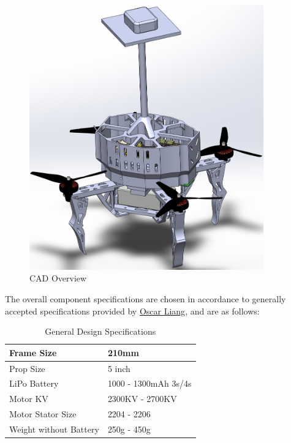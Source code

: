 \documentclass[12pt, titlepage]{article}
\begin{document}
\begin{figure}[h!]
  \begin{center} 
  \caption{CAD Overview}
  \label{OverallCAD}
        \includegraphics[width=0.9\textwidth]{CAD_Overview.png}
  \end{center}
\end{figure}

\clearpage

The overall component specifications are chosen in accordance to generally accepted specifications provided by \href{https://oscarliang.com/table-prop-motor-lipo-weight/}{Oscar Liang}, and are as follows:

\begin{table}[!h]
\begin{center}
\caption {General Design Specifications}
\label{tab:genDesignSpecs}
\begin{tabular}{ | m{7cm} | m{8cm} | } 
\hline
Frame Size & 210mm \\
\hline
Prop Size & 5 inch \\
\hline
LiPo Battery & 1000 - 1300mAh 3s/4s \\
\hline
Motor KV & 2300KV - 2700KV \\
\hline
Motor Stator Size & 2204 - 2206 \\
\hline
Weight without Battery & 250g - 450g \\
\hline
\end{tabular}
\end{center}
\end{table}
\end{document}

